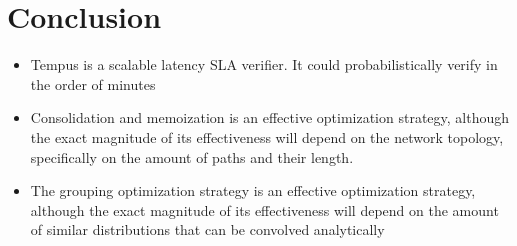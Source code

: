 \documentclass[10pt,sigconf,letterpaper,anonymous,nonacm]{acmart}
\begin{document}
\section{Conclusion}
\begin{itemize}
    \item Tempus is a scalable latency SLA verifier. It could probabilistically verify in the order of minutes
    \item Consolidation and memoization is an effective optimization strategy, although the exact magnitude of 
        its effectiveness will depend on the network topology, specifically on the amount of paths and their 
        length.
    \item The grouping optimization strategy is an effective optimization strategy, although the exact magnitude 
        of its effectiveness will depend on the amount of similar distributions that can be convolved analytically
\end{itemize}



\end{document}
